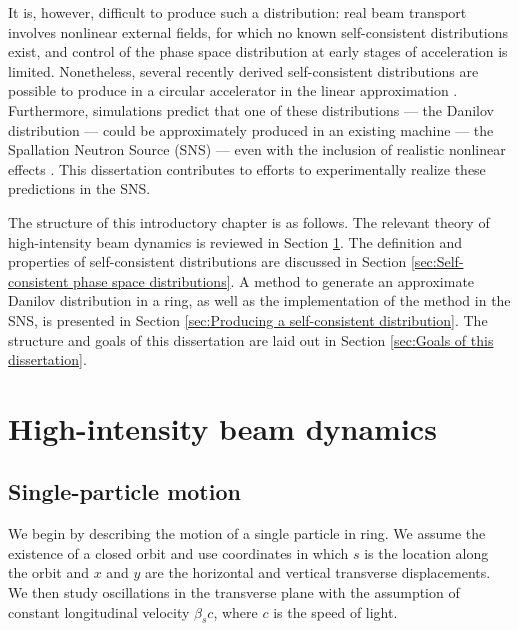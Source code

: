 It is, however, difficult to produce such a distribution: real beam transport involves nonlinear external fields, for which no known self-consistent distributions exist, and control of the phase space distribution at early stages of acceleration is limited. Nonetheless, several recently derived self-consistent distributions are possible to produce in a circular accelerator in the linear approximation \cite{Danilov2003}. Furthermore, simulations predict that one of these distributions — the Danilov distribution — could be approximately produced in an existing machine — the Spallation Neutron Source (SNS) — even with the inclusion of realistic nonlinear effects \cite{Holmes2018}. This dissertation contributes to efforts to experimentally realize these predictions in the SNS.

The structure of this introductory chapter is as follows. The relevant theory of high-intensity beam dynamics is reviewed in Section \ref{sec:High-intensity beam dynamics}. The definition and properties of self-consistent distributions are discussed in Section \ref{sec:Self-consistent phase space distributions}. A method to generate an approximate Danilov distribution in a ring, as well as the implementation of the method in the SNS, is presented in Section \ref{sec:Producing a self-consistent distribution}. The structure and goals of this dissertation are laid out in Section \ref{sec:Goals of this dissertation}.



\section{High-intensity beam dynamics}\label{sec:High-intensity beam dynamics}

\subsection{Single-particle motion}

We begin by describing the motion of a single particle in ring. We assume the existence of a closed orbit and use coordinates in which $s$ is the location along the orbit and $x$ and $y$ are the horizontal and vertical transverse displacements. We then study oscillations in the transverse plane with the assumption of constant longitudinal velocity $\beta_s c$, where $c$ is the speed of light.
 
